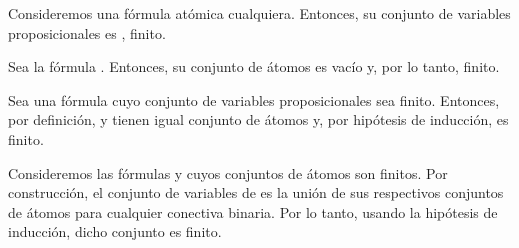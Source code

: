 \begin{isabellebody}
\begin{isamarkuptext}
\begin{demostracion}
  Consideremos una fórmula atómica  cualquiera. Entonces, 
  su conjunto de variables proposicionales es , finito.

  Sea la fórmula \isa{{\isasymbottom}}. Entonces, su conjunto de átomos es vacío y, por 
  lo tanto, finito.
  
  Sea  una fórmula cuyo conjunto de variables proposicionales sea 
  finito. Entonces, por definición,  y  tienen igual conjunto de
  átomos y, por hipótesis de inducción, es finito.

  Consideremos las fórmulas  y  cuyos conjuntos de átomos son 
  finitos. Por\\ construcción, el conjunto de variables de  es la 
  unión de sus respectivos conjuntos de átomos para cualquier \isa{{\isacharasterisk}} 
  conectiva binaria. Por lo tanto, usando la hipótesis de inducción, 
  dicho conjunto es finito. 
  \end{demostracion} 


\end{isamarkuptext}
\end{isabellebody}
